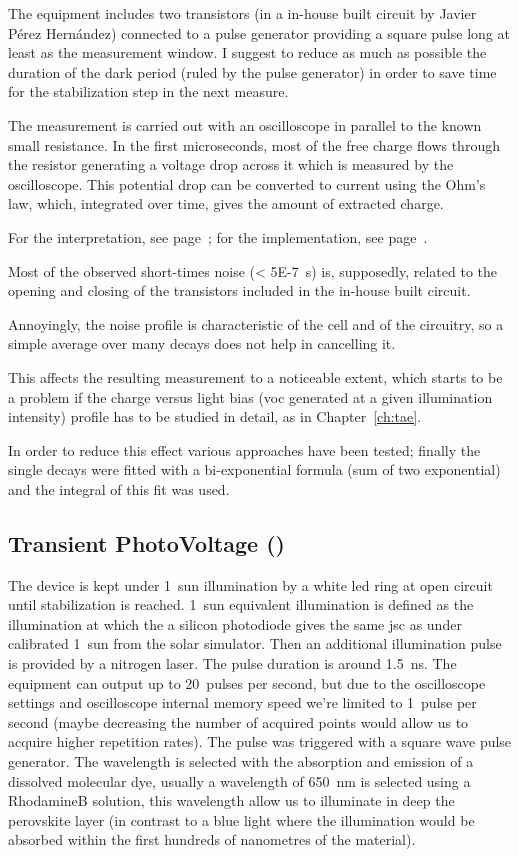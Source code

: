 		The equipment includes two transistors (in a in-house built circuit by Javier Pérez Hernández) connected to a pulse generator providing a square pulse long at least as the measurement window. I suggest to reduce as much as possible the duration of the dark period (ruled by the pulse generator) in order to save time for the stabilization step in the next measure.

		The measurement is carried out with an oscilloscope in parallel to the known small resistance. In the first microseconds, most of the free charge flows through the resistor generating a voltage drop across it which is measured by the oscilloscope. This potential drop can be converted to current using the Ohm's law, which, integrated over time, gives the amount of extracted charge.

		For the interpretation, see page~\pageref{interpretation_ce}; for the implementation, see page~\pageref{r_ce}.

		\label{r_ce_noise}
			Most of the observed short-times noise (\SI{< 5E-7}{\s}) is, supposedly, related to the opening and closing of the transistors included in the in-house built circuit.

			Annoyingly, the noise profile is characteristic of the cell and of the circuitry, so a simple average over many decays does not help in cancelling it.

			This affects the resulting measurement to a noticeable extent, which starts to be a problem if the charge versus light bias (\gls{voc} generated at a given illumination intensity) profile has to be studied in detail, as in Chapter~\ref{ch:tae}.

			In order to reduce this effect various approaches have been tested; finally the single decays were fitted with a bi-exponential formula (sum of two exponential) and the integral of this fit was used.

	\subsection{Transient PhotoVoltage ()}

		The device is kept under 1~sun illumination by a white \gls{led} ring at open circuit until stabilization is reached. 1~sun equivalent illumination is defined as the illumination at which the a silicon photodiode gives the same \gls{jsc} as under calibrated 1~sun from the solar simulator. Then an additional illumination pulse is provided by a nitrogen laser. The pulse duration is around \SI{1.5}{\ns}. The equipment can output up to 20~pulses per second, but due to the oscilloscope settings and oscilloscope internal memory speed we're limited to 1~pulse per second (maybe decreasing the number of acquired points would allow us to acquire higher repetition rates). The pulse was triggered with a square wave pulse generator. The wavelength is selected with the absorption and emission of a dissolved molecular dye, usually a wavelength of \SI{650}{\nm} is selected using a RhodamineB solution\cite{RadiantDyesLaser}, this wavelength allow us to illuminate in deep the perovskite layer (in contrast to a blue light where the illumination would be absorbed within the first hundreds of nanometres of the material).

